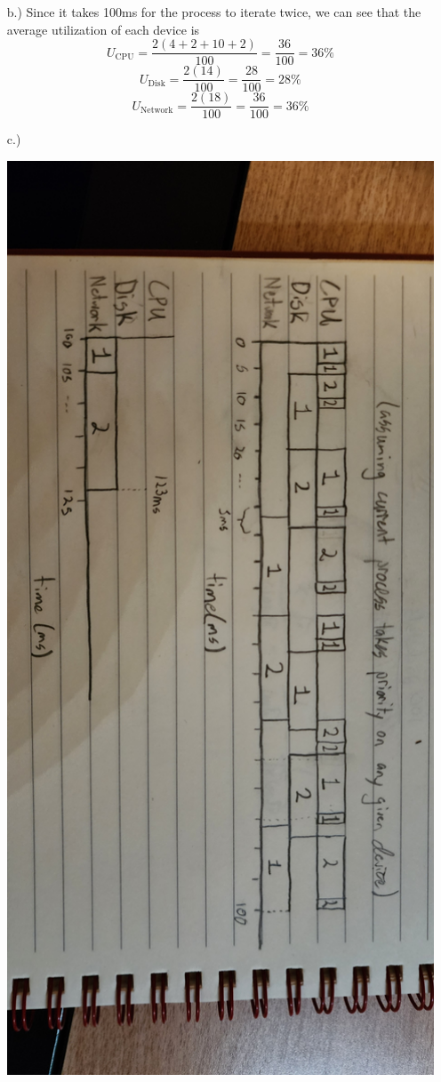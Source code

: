 \documentclass[12pt]{article}
\begin{document}
\begin{itemize}
\begin{itemize}
            \item [b.)] Since it takes 100ms for the process to iterate twice,
            we can see that the average utilization of each device is
            \[
                U_{\text{CPU}}
                = \frac{2(4 + 2 + 10 + 2)}{100}
                = \frac{36}{100}
                = 36\%
            \]
            \[
                U_{\text{Disk}}
                = \frac{2(14)}{100}
                = \frac{28}{100}
                = 28\%
            \]
            \[
                U_{\text{Network}}
                = \frac{2(18)}{100}
                = \frac{36}{100}
                = 36\%
            \]

            \item [c.)] \
            \begin{center}
                \includegraphics[width=5in]{3-3.jpg}

\end{center}
\end{itemize}
\end{itemize}
\end{document}
